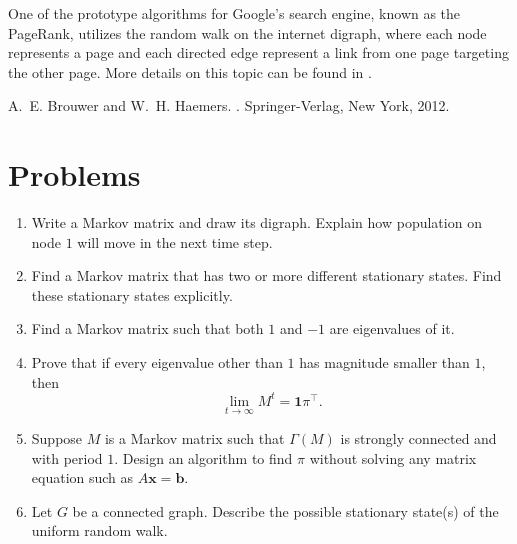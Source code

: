 \documentclass{article}
\newcommand{\trans}{^\top}
\newcommand{\bone}{\mathbf{1}}
\newcommand{\bb}{\mathbf{b}}
\newcommand{\bx}{\mathbf{x}}
\theoremstyle{definition}
\begin{document}
One of the prototype algorithms for Google's search engine, known as the PageRank, utilizes the random walk on the internet digraph, where each node represents a page and each directed edge represent a link from one page targeting the other page.  More details on this topic can be found in \cite{BHSoG12}.

\begin{thebibliography}{9}
A.~E. Brouwer and W.~H. Haemers.
.
\newblock Springer-Verlag, New York, 2012.
\end{thebibliography}

\section*{Problems}
\begin{enumerate}
\setlength\itemsep{2em}
\item Write a Markov matrix and draw its digraph.  Explain how population on node $1$ will move in the next time step.  
\item Find a Markov matrix that has two or more different stationary states.  Find these stationary states explicitly.
\item Find a Markov matrix such that both $1$ and $-1$ are eigenvalues of it.
\item Prove that if every eigenvalue other than $1$ has magnitude smaller than $1$, then 
\[\lim_{t\rightarrow\infty} M^t = \bone\pi\trans.\]
\item Suppose $M$ is a Markov matrix such that $\Gamma(M)$ is strongly connected and with period $1$.  Design an algorithm to find $\pi$ without solving any matrix equation such as $A\bx = \bb$.   
\item Let $G$ be a connected graph.  Describe the possible stationary state(s) of the uniform random walk.  
\end{enumerate}

\end{document}
